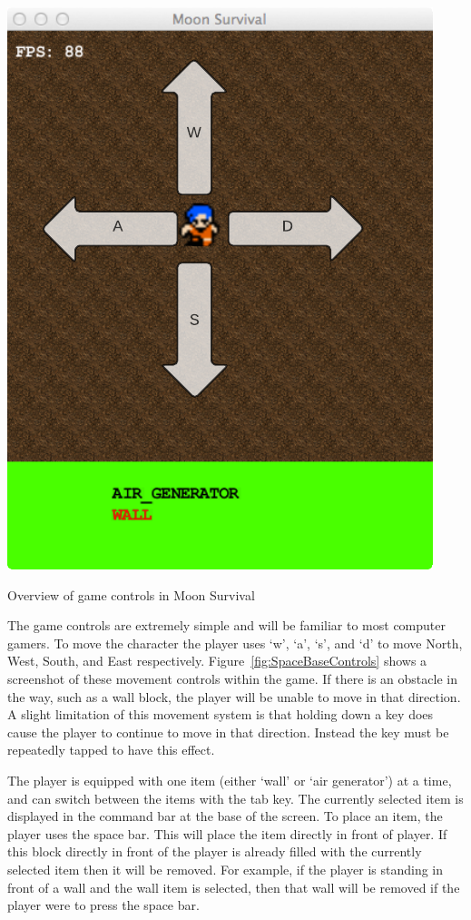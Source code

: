 \begin{marginfigure}
	\includegraphics{res/space_base_prototype/MoonSurvivalControls.pdf}
	\caption{Overview of game controls in Moon Survival}
	\label{fig:SpaceBaseControls}
\end{marginfigure}

The game controls are extremely simple and will be familiar to most computer gamers. To move the character the player uses `w', `a', `s', and `d' to move North, West, South, and East respectively. Figure~\ref{fig:SpaceBaseControls} shows a screenshot of these movement controls within the game. If there is an obstacle in the way, such as a wall block, the player will be unable to move in that direction. A slight limitation of this movement system is that holding down a key does cause the player to continue to move in that direction. Instead the key must be repeatedly tapped to have this effect.

The player is equipped with one item (either `wall' or `air generator') at a time, and can switch between the items with the tab key. The currently selected item is displayed in the command bar at the base of the screen. To place an item, the player uses the space bar. This will place the item directly in front of player. If this block directly in front of the player is already filled with the currently selected item then it will be removed. For example, if the player is standing in front of a wall and the wall item is selected, then that wall will be removed if the player were to press the space bar.


